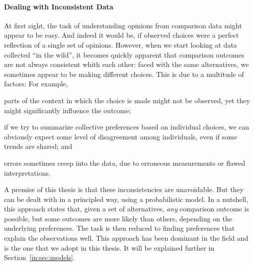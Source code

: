 \paragraph{Dealing with Inconsistent Data}
At first sight, the task of understanding opinions from comparison data might appear to be easy.
And indeed it would be, if observed choices were a perfect reflection of a single set of opinions.
However, when we start looking at data collected ``in the wild'', it becomes quickly apparent that comparison outcomes are not always consistent whith each other:
faced with the same alternatives, we sometimes appear to be making different choices.
This is due to a multitude of factors:
For example,
\begin{enuminline}
\item parts of the context in which the choice is made might not be observed, yet they might significantly influence the outcome;
\item if we try to summarize collective preferences based on individual choices, we can obviously expect some level of disagreement among individuals, even if some trends are shared; and
\item errors sometimes creep into the data, due to erroneous measurements or flawed interpretations.
\end{enuminline}
A premise of this thesis is that these inconsistencies are unavoidable.
But they can be dealt with in a principled way, using a probabilistic model.
In a nutshell, this approach states that, given a set of alternatives, \emph{any} comparison outcome is possible, but some outcomes are more likely than others, depending on the underlying preferences.
The task is then reduced to finding preferences that explain the observations well.
This approach has been dominant in the field and is the one that we adopt in this thesis.
It will be explained further in Section~\ref{in:sec:models}.

